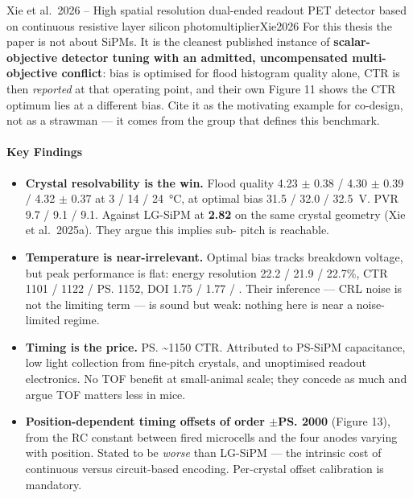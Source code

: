 \begin{papernote}{Xie et al.\ 2026 -- High spatial resolution dual-ended readout PET detector based on continuous resistive layer silicon photomultiplier}{Xie2026}
For this thesis the paper is not about SiPMs. It is the cleanest published
instance of \textbf{scalar-objective detector tuning with an admitted,
uncompensated multi-objective conflict}: bias is optimised for flood histogram
quality alone, CTR is then \emph{reported} at that operating point, and their own
Figure 11 shows the CTR optimum lies at a different bias. Cite it as the
motivating example for co-design, not as a strawman --- it comes from the group
that defines this benchmark.
 
\paragraph{Key Findings}
\begin{itemize}
	\item \textbf{Crystal resolvability is the win.} Flood quality
		4.23 $\pm$ 0.38 / 4.30 $\pm$ 0.39 / 4.32 $\pm$ 0.37 at 3 / 14 /
		\qty{24}{\degreeCelsius}, at optimal bias 31.5 / 32.0 /
		\qty{32.5}{\volt}. PVR 9.7 / 9.1 / 9.1. Against LG-SiPM at
		\textbf{2.82} on the same crystal geometry (Xie et al.\ 2025a). They
		argue this implies sub- pitch is reachable.
	\item \textbf{Temperature is near-irrelevant.} Optimal bias tracks
		breakdown voltage, but peak performance is flat: energy resolution
		22.2 / 21.9 / 22.7\%, CTR 1101 / 1122 / \ps{1152}, DOI
		1.75 / 1.77 / . Their inference --- CRL noise is not the
		limiting term --- is sound but weak: nothing here is near a
		noise-limited regime.
	\item \textbf{Timing is the price.} \ps{\sim1150} CTR. Attributed to
		PS-SiPM capacitance, low light collection from fine-pitch crystals, and
		unoptimised readout electronics. No TOF benefit at small-animal scale;
		they concede as much and argue TOF matters less in mice.
	\item \textbf{Position-dependent timing offsets of order
		$\pm$\ps{2000}} (Figure 13), from the RC constant between fired
		microcells and the four anodes varying with position. Stated to be
		\emph{worse} than LG-SiPM --- the intrinsic cost of continuous versus
		circuit-based encoding. Per-crystal offset calibration is mandatory.

\end{itemize}
\end{papernote}
